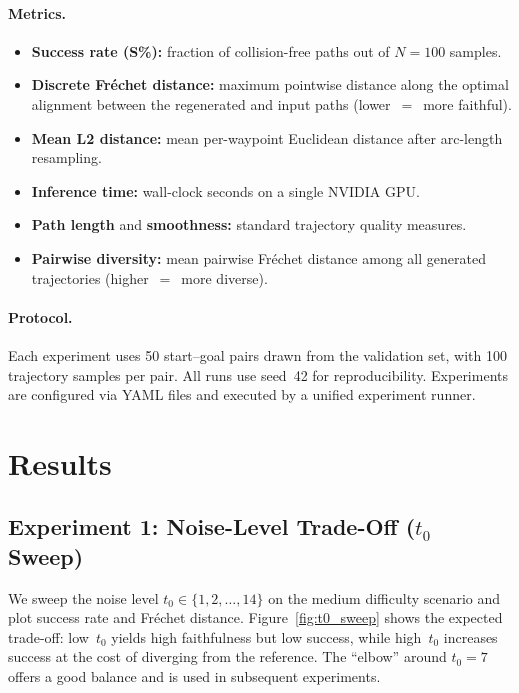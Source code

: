 \documentclass[12pt]{article}
\begin{document}
\paragraph{Metrics.}
\begin{itemize}
  \item \textbf{Success rate (S\%):} fraction of collision-free paths out of
        $N{=}100$ samples.
  \item \textbf{Discrete Fréchet distance:} maximum pointwise distance along
        the optimal alignment between the regenerated and input paths
        (lower~$=$~more faithful).
  \item \textbf{Mean L2 distance:} mean per-waypoint Euclidean distance
        after arc-length resampling.
  \item \textbf{Inference time:} wall-clock seconds on a single NVIDIA GPU.
  \item \textbf{Path length} and \textbf{smoothness:} standard trajectory
        quality measures.
  \item \textbf{Pairwise diversity:} mean pairwise Fréchet distance among all
        generated trajectories (higher~$=$~more diverse).
\end{itemize}

\paragraph{Protocol.}
Each experiment uses 50 start--goal pairs drawn from the validation set, with
100 trajectory samples per pair.  All runs use seed~42 for reproducibility.
Experiments are configured via YAML files and executed by a unified experiment
runner.

\section{Results}
\label{sec:results}

\subsection{Experiment 1: Noise-Level Trade-Off ($t_0$ Sweep)}
\label{sec:exp_t0}

We sweep the noise level $t_0 \in \{1, 2, \dots, 14\}$ on the medium
difficulty scenario and plot success rate and Fréchet distance.
Figure~\ref{fig:t0_sweep} shows the expected trade-off: low~$t_0$ yields
high faithfulness but low success, while high~$t_0$ increases success at the
cost of diverging from the reference.  The ``elbow'' around $t_0{=}7$
offers a good balance and is used in subsequent experiments.
\end{document}
